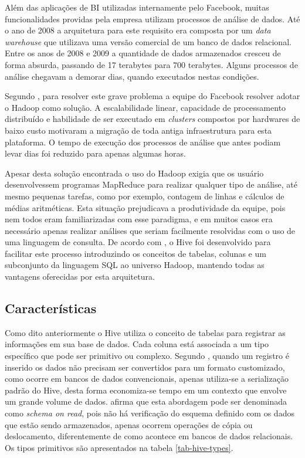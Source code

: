 Além das aplicações de BI utilizadas internamente pelo Facebook, muitas funcionalidades providas pela empresa utilizam processos de análise de dados. Até o ano de 2008 a arquitetura para este requisito era composta por um \textit{data warehouse} que utilizava uma versão comercial de um banco de dados relacional. Entre os anos de 2008 e 2009 a quantidade de dados armazenados cresceu de forma absurda, passando de 17 terabytes para 700 terabytes. Alguns processos de análise chegavam a demorar dias, quando executados nestas condições.

Segundo , para resolver este grave problema a equipe do Facebook resolver adotar o Hadoop como solução. A escalabilidade linear, capacidade de processamento distribuído e habilidade de ser executado em \textit{clusters} compostos por hardwares de baixo custo motivaram a migração de toda antiga infraestrutura para esta plataforma. O tempo de execução dos processos de análise que antes podiam levar dias foi reduzido para apenas algumas horas.

Apesar desta solução encontrada o uso do Hadoop exigia que os usuário desenvolvessem programas MapReduce para realizar qualquer tipo de análise, até mesmo pequenas tarefas, como por exemplo, contagem de linhas e cálculos de médias aritméticas. Esta situação prejudicava a produtividade da equipe, pois nem todos eram familiarizadas com esse paradigma, e em muitos casos era necessário apenas realizar análises que seriam facilmente resolvidas com o uso de uma linguagem de consulta. De acordo com , o Hive foi desenvolvido para facilitar este processo introduzindo os conceitos de tabelas, colunas e um subconjunto da linguagem SQL ao universo Hadoop, mantendo todas as vantagens oferecidas por esta arquitetura.

\subsection{Características}

Como dito anteriormente o Hive utiliza o conceito de tabelas para registrar as informações em sua base de dados. Cada coluna está associada a um tipo específico que pode ser primitivo ou complexo. Segundo , quando um registro é inserido os dados não precisam ser convertidos para um formato customizado, como ocorre em bancos de dados convencionais, apenas utiliza-se a serialização padrão do Hive, desta forma economiza-se tempo em um contexto que envolve um grande volume de dados.  afirma que esta abordagem pode ser denominada como \textit{schema on read}, pois não há verificação do esquema definido com os dados que estão sendo armazenados, apenas ocorrem operações de cópia ou deslocamento, diferentemente de como acontece em bancos de dados relacionais. Os tipos primitivos são apresentados na tabela \ref{tab-hive-types}.

